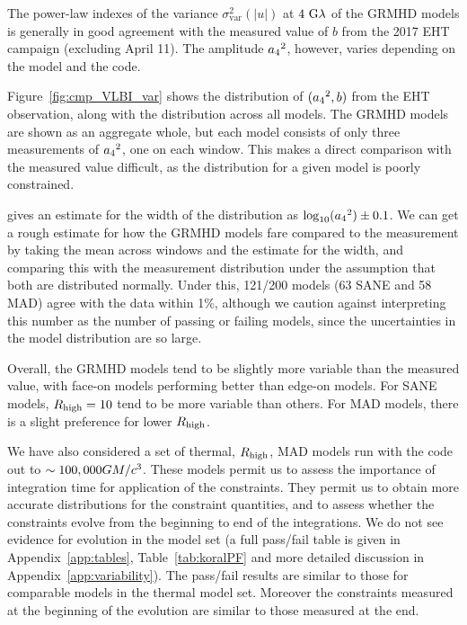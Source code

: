 The power-law indexes of the variance $\sigma_\text{var}^2 (|u|)$ at $4~{\rm G}\lambda$ of the GRMHD models is generally in good agreement with the measured value of $b$ from the 2017 EHT campaign (excluding April 11). The amplitude ${a_4}^2$, however, varies depending on the model and the code.

Figure~\ref{fig:cmp_VLBI_var} shows the distribution of $({a_4}^2, b)$ from the EHT observation, along with the distribution across all \kharma models. The GRMHD models are shown as an aggregate whole, but each model consists of only three measurements of ${a_4}^2$, one on each window. This makes a direct comparison with the measured value difficult, as the distribution for a given model is poorly constrained.

\citet{Georgiev_2022} gives an estimate for the width of the distribution as $\log_{10}({a_4}^2) \pm 0.1$. We can get a rough estimate for how the GRMHD models fare compared to the measurement by taking the mean across windows and the estimate for the width, and comparing this with the measurement distribution under the assumption that both are distributed normally. Under this, 121/200 models (63 SANE and 58 MAD) agree with the data within 1\%, although we caution against interpreting this number as the number of passing or failing models, since the uncertainties in the model distribution are so large.

Overall, the GRMHD models tend to be slightly more variable than the measured value, with face-on models performing better than edge-on models. For SANE models, $R_\mathrm{high} = 10$ tend to be more variable than others. For MAD models, there is a slight preference for lower $R_\mathrm{high}$.

We have also considered a set of thermal, $R_\mathrm{high}$, MAD models run with the \koral code out to $\sim 100,000GM/c^3$.  These models permit us to assess the importance of integration time for application of the constraints.  They permit us to obtain more accurate distributions for the constraint quantities, and to assess whether the constraints evolve from the beginning to end of the integrations. We do not see evidence for evolution in the \koral model set (a full pass/fail table is given in Appendix~\ref{app:tables}, Table~\ref{tab:koralPF} and more detailed discussion in Appendix~\ref{app:variability}). The \koral pass/fail results are similar to those for comparable models in the \kharma thermal model set. Moreover the constraints measured at the beginning of the evolution are similar to those measured at the end.

